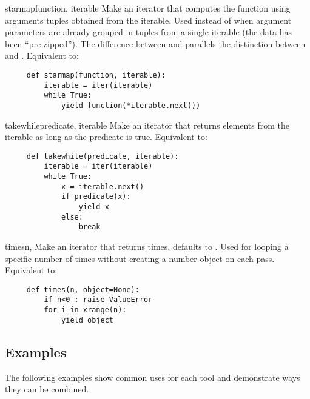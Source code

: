 \begin{funcdesc}{starmap}{function, iterable}
  Make an iterator that computes the function using arguments tuples
  obtained from the iterable.  Used instead of  when
  argument parameters are already grouped in tuples from a single iterable
  (the data has been ``pre-zipped'').  The difference between
   and  parallels the distinction
  between  and .
  Equivalent to:

  \begin{verbatim}
     def starmap(function, iterable):
         iterable = iter(iterable)
         while True:
             yield function(*iterable.next())
  \end{verbatim}
\end{funcdesc}

\begin{funcdesc}{takewhile}{predicate, iterable}
  Make an iterator that returns elements from the iterable as long as
  the predicate is true.  Equivalent to:

  \begin{verbatim}
     def takewhile(predicate, iterable):
         iterable = iter(iterable)
         while True:
             x = iterable.next()
             if predicate(x):
                 yield x
             else:
                 break
  \end{verbatim}
\end{funcdesc}

\begin{funcdesc}{times}{n, }
  Make an iterator that returns   times.
   defaults to .  Used for looping a specific
  number of times without creating a number object on each pass.
  Equivalent to:

  \begin{verbatim}
     def times(n, object=None):
         if n<0 : raise ValueError
         for i in xrange(n):
             yield object
  \end{verbatim}
\end{funcdesc}


\subsection{Examples \label{itertools-example}}

The following examples show common uses for each tool and
demonstrate ways they can be combined.

